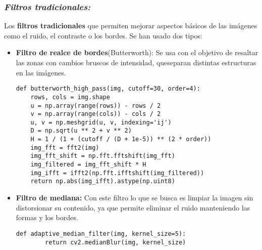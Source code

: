 \documentclass[12pt]{article}
\begin{document}
\subsubsection{\textit{Filtros tradicionales:}}
Los  \textbf{filtros tradicionales} que permiten mejorar aspectos básicos de las imágenes como el ruido, el contraste o los bordes. Se han usado dos tipos:
\begin{itemize}
    \item \textbf{Filtro de realce de bordes}(Butterworth): Se usa con el objetivo de resaltar las zonas con cambios bruscos de intensidad, queseparan distintas estructuras en las imágenes.
\begin{lstlisting}[caption={Filtro de Butterworth en frecuencia:}, label=lst:butter]
def butterworth_high_pass(img, cutoff=30, order=4):
    rows, cols = img.shape
    u = np.array(range(rows)) - rows / 2
    v = np.array(range(cols)) - cols / 2
    u, v = np.meshgrid(u, v, indexing='ij')
    D = np.sqrt(u ** 2 + v ** 2)
    H = 1 / (1 + (cutoff / (D + 1e-5)) ** (2 * order))
    img_fft = fft2(img)
    img_fft_shift = np.fft.fftshift(img_fft)
    img_filtered = img_fft_shift * H
    img_ifft = ifft2(np.fft.ifftshift(img_filtered))
    return np.abs(img_ifft).astype(np.uint8)
\end{lstlisting}
    \item \textbf{Filtro de mediana:} Con este filtro lo que se busca es limpiar la imagen sin distorsionar su contenido, ya que permite eliminar el ruido manteniendo las formas y los bordes.
    \begin{lstlisting}[caption={Filtro de mediana en Python}, label=lst:median]
    def adaptive_median_filter(img, kernel_size=5):
        return cv2.medianBlur(img, kernel_size)
    \end{lstlisting}

\end{itemize}
\end{document}

